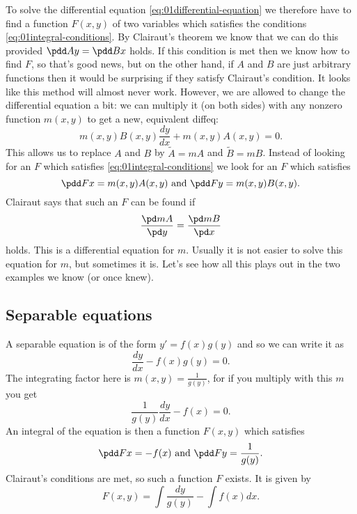 To solve the differential equation \eqref{eq:01differential-equation} we therefore
have to find a function $F(x, y)$ of two variables which satisfies the
conditions \eqref{eq:01integral-conditions}.  By Clairaut's theorem we know that
we can do this provided $\pdd Ay  = \pdd Bx $ holds.  If
this condition is met then we know how to find $F$, so that's good news, but on
the other hand, if $A$ and $B$ are just arbitrary functions then it would be
surprising if they satisfy Clairaut's condition.  It looks like this method will
almost never work.  However, we are allowed to change the differential equation
a bit: we can multiply it (on both sides) with any nonzero function $m(x, y)$ to
get a new, equivalent diffeq:
\begin{equation}
  m(x,y)B(x, y) \frac{dy}{dx} + m(x, y)A(x, y) = 0.
  \label{eq:01differential-equation-times-m}
\end{equation}
This allows us to replace $A$ and $B$ by $\tilde A = m A$ and $\tilde B = mB$.  
Instead of looking for an $F$ which satisfies \eqref{eq:01integral-conditions}
we look for an $F$ which satisfies
\begin{equation}
  \pdd Fx  = m(x,y)A(x, y)\text{ and }  \pdd Fy  =
  m(x,y)B(x, y) .
  \label{eq:01integral-conditions-times-m}
\end{equation}
Clairaut says that such an $F$ can be found if 
\[
\frac{\pd mA}{\pd y} = \frac{\pd mB}{\pd x}
\]
holds.  This is a differential equation for $m$.  Usually it is not easier to
solve this equation for $m$, but sometimes it is.  Let's see how all this plays
out in the two examples we know (or once knew).

\subsection{Separable equations}
A separable equation is of the form $y' = f(x) g(y)$ and so we can write it as
\[
\frac{dy}{dx} - f(x) g(y) = 0.
\]
The integrating factor here is $m(x, y) = \frac{1}{g(y)}$, for if you multiply
with this $m$
you get
\[
\frac{1}{g(y)}\frac{dy}{dx} - f(x) = 0.
\]
An integral of the equation is then a function $F(x, y)$ which satisfies
\[
\pdd Fx  = -f(x) \text { and }
\pdd Fy  = \frac{1}{g(y)}.
\]
Clairaut's conditions are met, so such a function $F$ exists.  It is given by
\[
F(x, y) = \int \frac{dy}{g(y)}  - \int f(x) dx.
\]
